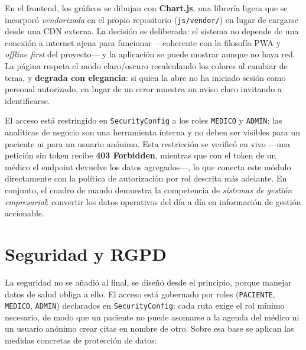 \documentclass[12pt,a4paper]{report}
\begin{document}
En el frontend, los gráficos se dibujan con \textbf{Chart.js}, una librería ligera que se incorporó \emph{vendorizada} en el propio repositorio (\texttt{js/vendor/}) en lugar de cargarse desde una CDN externa. La decisión es deliberada: el sistema no depende de una conexión a internet ajena para funcionar —coherente con la filosofía PWA y \emph{offline first} del proyecto— y la aplicación se puede mostrar aunque no haya red. La página respeta el modo claro/oscuro recalculando los colores al cambiar de tema, y \textbf{degrada con elegancia}: si quien la abre no ha iniciado sesión como personal autorizado, en lugar de un error muestra un aviso claro invitando a identificarse.

El acceso está restringido en \texttt{SecurityConfig} a los roles \texttt{MEDICO} y \texttt{ADMIN}: las analíticas de negocio son una herramienta interna y no deben ser visibles para un paciente ni para un usuario anónimo. Esta restricción se verificó en vivo —una petición sin token recibe \textbf{403 Forbidden}, mientras que con el token de un médico el endpoint devuelve los datos agregados—, lo que conecta este módulo directamente con la política de autorización por rol descrita más adelante. En conjunto, el cuadro de mando demuestra la competencia de \emph{sistemas de gestión empresarial}: convertir los datos operativos del día a día en información de gestión accionable.

\section{Seguridad y RGPD}

La seguridad no se añadió al final, se diseñó desde el principio, porque manejar datos de salud obliga a ello. El acceso está gobernado por roles (\texttt{PACIENTE}, \texttt{MEDICO}, \texttt{ADMIN}) declarados en \texttt{SecurityConfig}: cada ruta exige el rol mínimo necesario, de modo que un paciente no puede asomarse a la agenda del médico ni un usuario anónimo crear citas en nombre de otro. Sobre esa base se aplican las medidas concretas de protección de datos:
\end{document}
